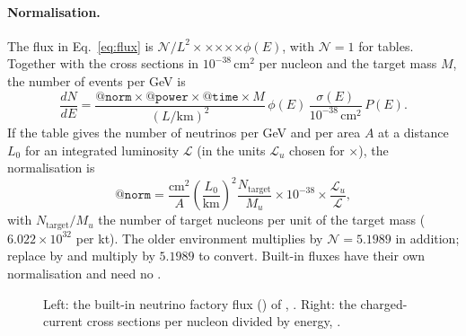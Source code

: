 \paragraph{Normalisation.} The flux in Eq.~\eqref{eq:flux} is
$\mathcal N/L^2\times$$\times$$\times$$\times$$\times\phi(E)$,
with $\mathcal N=1$ for  tables. Together with the cross sections
in $10^{-38}\,\mathrm{cm^2}$ per nucleon and the target mass $M$, the number
of events per GeV is
\begin{equation}
\frac{dN}{dE} = \frac{\texttt{@norm}\times\texttt{@power}\times\texttt{@time}\times M}{(L/\mathrm{km})^2}\,
  \phi(E)\,\frac{\sigma(E)}{10^{-38}\,\mathrm{cm}^2}\,P(E).
\end{equation}
If the table gives the number of neutrinos per GeV and per area $A$ at a
distance $L_0$ for an integrated luminosity $\mathcal L$ (in the units
$\mathcal L_u$ chosen for $\times$), the normalisation is
\begin{equation}
\texttt{@norm} = \frac{\mathrm{cm}^2}{A}\left(\frac{L_0}{\mathrm{km}}\right)^2
  \frac{N_\text{target}}{M_u}\times10^{-38}\times\frac{\mathcal L_u}{\mathcal L},
\end{equation}
with $N_\text{target}/M_u$ the number of target nucleons per unit of the
target mass ($6.022\times10^{32}$ per kt). The older environment 
multiplies by $\mathcal N = 5.1989$ in addition; replace  by
 and multiply  by $5.1989$ to convert. Built-in fluxes
have their own normalisation and need no .

\begin{figure}[t]
\centering
{}\hfill
{}
\caption{Left: the built-in neutrino factory flux () of
, .
Right: the charged-current cross sections per nucleon divided by energy,
.}
\label{fig:flux}
\end{figure}

